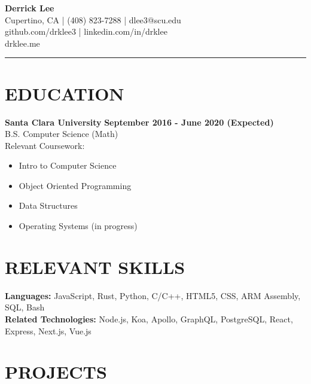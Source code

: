 \documentclass{res}
\begin{document}
	\thispagestyle{empty} %
	\begin{multicols}{2}
		\vfill\null
		{\bf \huge{Derrick Lee}} \\
		
		\hspace*{\fill} {Cupertino, CA | (408) 823-7288 | dlee3@scu.edu} \\
		\hspace*{\fill} {github.com/drklee3 | linkedin.com/in/drklee} \\
		\hspace*{\fill} {drklee.me} \\
	\end{multicols}
	\vspace{-10mm}
	\noindent\rule{\textwidth}{1pt}
	
	\begin{resume}

		\section{EDUCATION}

		{\bf Santa Clara University} \hfill {\bf September 2016 - June 2020 (Expected)} \\
			B.S. Computer Science (Math) \\
			Relevant Coursework:
			\vspace{-3.5mm}
			\begin{multicols}{2}
			\begin{itemize} \itemsep -2pt
				\item Intro to Computer Science
				\item Object Oriented Programming
				\item Data Structures
				\item Operating Systems (in progress)
			\end{itemize}
			\end{multicols}
		
		\section{RELEVANT SKILLS}
		\vspace{6pt}

			{\bf Languages:} JavaScript, Rust, Python, C/C++, HTML5, CSS, ARM Assembly, SQL, Bash \\
			{\bf Related Technologies:} Node.js, Koa, Apollo, GraphQL, PostgreSQL, React, Express, Next.js, Vue.js

		\section{PROJECTS}
		\vspace{6pt}


\end{resume}
\end{document}
